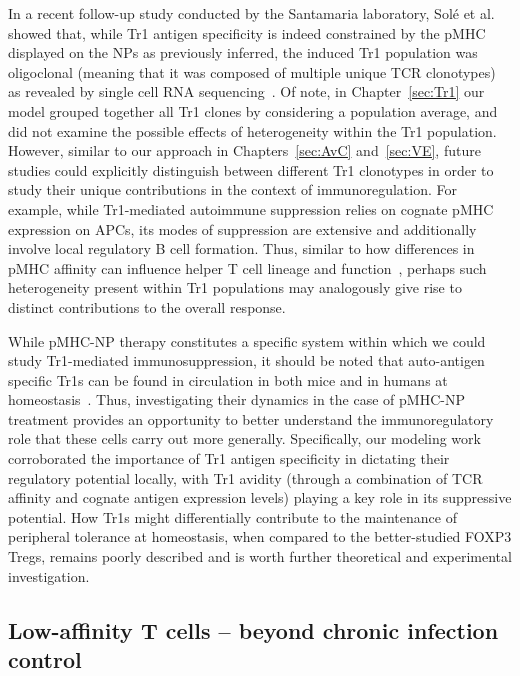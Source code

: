 In a recent follow-up study conducted by the Santamaria laboratory, Solé et al. showed that, while Tr1 antigen specificity is indeed constrained by the pMHC displayed on the NPs as previously inferred, the induced Tr1 population was oligoclonal (meaning that it was composed of multiple unique TCR clonotypes) as revealed by single cell RNA sequencing~\cite{sole2023transcriptional}. Of note, in Chapter~\ref{sec:Tr1} our model grouped together all Tr1 clones by considering a population average, and did not examine the possible effects of heterogeneity within the Tr1 population. However, similar to our approach in Chapters~\ref{sec:AvC} and~\ref{sec:VE}, future studies could explicitly distinguish between different Tr1 clonotypes in order to study their unique contributions in the context of immunoregulation. For example, while Tr1-mediated autoimmune suppression relies on cognate pMHC expression on APCs, its modes of suppression are extensive and additionally involve local regulatory B cell formation. Thus, similar to how differences in pMHC affinity can influence helper T cell lineage and function~\cite{martin2013highly,van2014t,sood2019differential,rogers2021pre,snook2018tcr,ditoro2018differential,van2016tcr}, perhaps such heterogeneity present within Tr1 populations may analogously give rise to distinct contributions to the overall response.

While pMHC-NP therapy constitutes a specific system within which we could study Tr1-mediated immunosuppression, it should be noted that auto-antigen specific Tr1s can be found in circulation in both mice and in humans at homeostasis~\cite{gagliani2013coexpression,freeborn2022type}. Thus, investigating their dynamics in the case of pMHC-NP treatment provides an opportunity to better understand the immunoregulatory role that these cells carry out more generally. Specifically, our modeling work corroborated the importance of Tr1 antigen specificity in dictating their regulatory potential locally, with Tr1 avidity (through a combination of TCR affinity and cognate antigen expression levels) playing a key role in its suppressive potential. How Tr1s might differentially contribute to the maintenance of peripheral tolerance at homeostasis, when compared to the better-studied FOXP3\pos{} Tregs, remains poorly described and is worth further theoretical and experimental investigation.

\subsection{Low-affinity T cells -- beyond chronic infection control}

